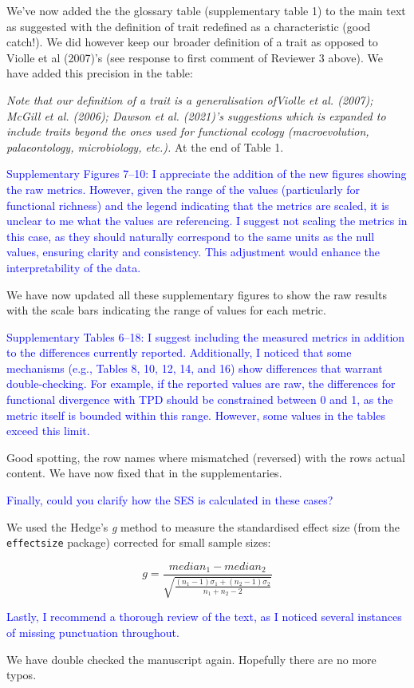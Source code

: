 \documentclass[
]{article}
\begin{document}
We've now added the the glossary table (supplementary table 1) to the main text as suggested with the definition of trait redefined as a characteristic (good catch!).
We did however keep our broader definition of a trait as opposed to Violle et al (2007)'s (see response to first comment of Reviewer 3 above).
We have added this precision in the table:

\textit{Note that our definition of a trait is a generalisation ofViolle et al. (2007); McGill et al.
(2006); Dawson et al. (2021)’s suggestions which is expanded to include traits beyond the ones used for functional ecology (macroevolution, palaeontology, microbiology, etc.).} At the end of Table 1.

\textcolor{blue}{Supplementary Figures 7–10: I appreciate the addition of the new figures showing the raw metrics.
However, given the range of the values (particularly for functional richness) and the legend indicating that the metrics are scaled, it is unclear to me what the values are referencing.
I suggest not scaling the metrics in this case, as they should naturally correspond to the same units as the null values, ensuring clarity and consistency.
This adjustment would enhance the interpretability of the data.}

We have now updated all these supplementary figures to show the raw results with the scale bars indicating the range of values for each metric.

\textcolor{blue}{Supplementary Tables 6–18: I suggest including the measured metrics in addition to the differences currently reported.
Additionally, I noticed that some mechanisms (e.g., Tables 8, 10, 12, 14, and 16) show differences that warrant double-checking.
For example, if the reported values are raw, the differences for functional divergence with TPD should be constrained between 0 and 1, as the metric itself is bounded within this range.
However, some values in the tables exceed this limit.}

Good spotting, the row names where mismatched (reversed) with the rows actual content.
We have now fixed that in the supplementaries.

\textcolor{blue}{Finally, could you clarify how the SES is calculated in these cases?}

We used the Hedge's \textit{g} method to measure the standardised effect size (from the \texttt{effectsize} package) corrected for small sample sizes:

\begin{equation}
g = \frac{
        median_{1} - median_{2}
      }{
    \sqrt{
      \frac{
           (n_{1}-1)\sigma_{1} + (n_{2}-1)\sigma_{2}
          }{
            n_{1}+n_{2}-2
          }
        }
      }
\end{equation}

\textcolor{blue}{Lastly, I recommend a thorough review of the text, as I noticed several instances of missing punctuation throughout.}

We have double checked the manuscript again.
Hopefully there are no more typos.
\end{document}
